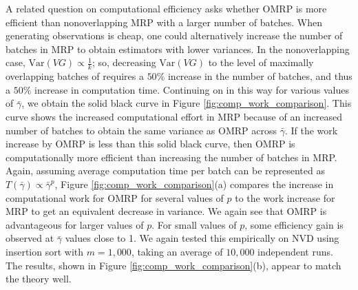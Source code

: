 \documentclass[12pt]{article}
\newcommand{\var}[1]{\mathrm{Var} \left( #1 \right)}
\newcommand{\gammab}{\bar{\gamma}}
\begin{document}
A related question on computational efficiency asks whether OMRP is more efficient than nonoverlapping MRP with a larger number of batches.
When generating observations is cheap, one could alternatively increase the number of batches in MRP to obtain estimators with lower variances. 
In the nonoverlapping case, $\var{VG} \propto \frac{1}{k}$; so, decreasing $\var{VG}$ to the level of maximally overlapping batches of \cite{Meketon1984} requires a $50\%$ increase in the number of batches, and thus a $50\%$ increase in computation time.
Continuing on in this way for various values of $\gammab$, we obtain the solid black curve in Figure \ref{fig:comp_work_comparison}. 
This curve shows the increased computational effort in MRP because of an increased number of batches to obtain the same variance as OMRP across $\gammab$.
If the work increase by OMRP is less than this solid black curve, then OMRP is computationally more efficient than increasing the number of batches in MRP. 
Again, assuming average computation time per batch can be represented as $T(\gammab) \propto \gammab^p$, Figure \ref{fig:comp_work_comparison}(a) compares the increase in computational work for OMRP for several values of $p$ to the work increase for MRP to get an equivalent decrease in variance.
We again see that OMRP is advantageous for larger values of $p$.
For small values of $p$, some efficiency gain is observed at $\gammab$ values close to 1.
We again tested this empirically on NVD using insertion sort with $m=1,000$, taking an average of $10,000$ independent runs. 
The results, shown in Figure \ref{fig:comp_work_comparison}(b), appear to match the theory well. 
\end{document}
